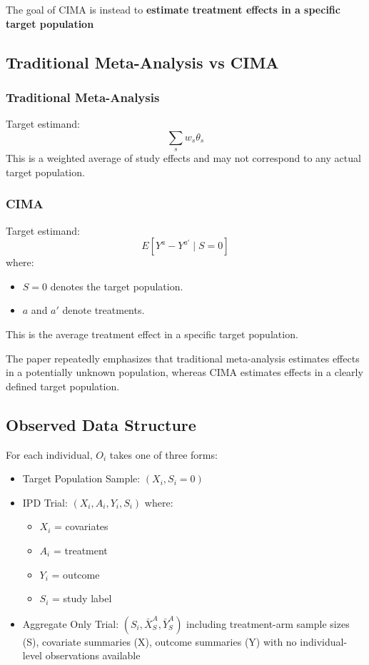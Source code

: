 \documentclass[11pt]{article}
\begin{document}
The goal of CIMA is instead to \textbf{estimate treatment effects in a specific target population}

\subsection*{Traditional Meta-Analysis vs CIMA}

\subsubsection*{Traditional Meta-Analysis}

Target estimand:\[\sum_s w_s \theta_s\]
This is a weighted average of study effects and may not correspond to any actual target population.

\subsubsection*{CIMA}

Target estimand:\[E[Y^a - Y^{a'} \mid S=0]\]
where:
\begin{itemize}
    \item $S=0$ denotes the target population.
    \item $a$ and $a'$ denote treatments.
\end{itemize}
This is the average treatment effect in a specific target population.

The paper repeatedly emphasizes that traditional meta-analysis estimates effects in a potentially unknown population, whereas CIMA estimates effects in a clearly defined target population.

\subsection*{Observed Data Structure}

For each individual, $O_i$ takes one of three forms: 
\begin{itemize}
    \item Target Population Sample: $(X_i, S_i = 0)$
    \item IPD Trial: $(X_i, A_i, Y_i, S_i)$ where:
    \begin{itemize}
        \item $X_i$ = covariates
        \item $A_i$ = treatment
        \item $Y_i$ = outcome
        \item $S_i$ = study label
    \end{itemize}
    \item Aggregate Only Trial: $(S_i, \bar X_S^A, \bar Y_S^A)$ including treatment-arm sample sizes (S), covariate summaries (X), outcome summaries (Y) with no individual-level observations available
\end{itemize}
\end{document}
